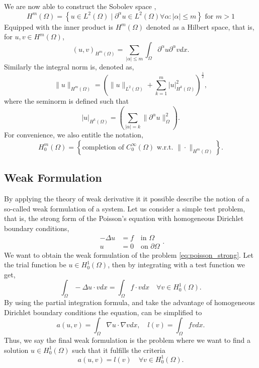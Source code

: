 We are now able to construct the Sobolev space \cite{manzoni2021optimal}, \[
H^{m}\left( \Omega  \right) = \left\{ u \in L^{2}\left( \Omega  \right)  \mid  \partial ^{\alpha } u \in L^{2}\left( \Omega  \right)  \forall \alpha : \left\lvert \alpha  \right\rvert  \le m \right\} \text{ for } m>1
\]
Equipped with the inner product is $H^{m}\left( \Omega  \right) $  denoted as a Hilbert space, that is, for $u,v \in H^{m}\left( \Omega  \right) $, \[
    \left( u,v \right) _{H^{m}\left( \Omega   \right) } = \sum_{\left\lvert \alpha  \right\rvert  \le  m}^{}  \int_{\Omega }^{} \partial ^{\alpha } u \partial ^{\alpha } v dx.
\]
Similarly the integral norm is, denoted as, \[
\| u \|_{ H^{m}\left( \Omega  \right)  }^{  }  = \left( \| u \|_{ L^{2}\left( \Omega  \right)    } + \sum_{k = 1}^{m}  \left\lvert u \right\rvert ^{2} _{  H^{k}\left( \Omega  \right) }\right) ^{\frac{1}{2}},
\]
where the seminorm is defined such that \[
\left\lvert u \right\rvert _{H^{k}\left( \Omega  \right) } = \left( \sum_{\left\lvert \alpha  \right\rvert  = k}^{} \| \partial ^{\alpha }u \|_{ \Omega  }^{ 2 }  \right).
\]
For convenience, we also entitle the notation,
\[
H^{m}_{0} \left( \Omega  \right) = \left\{ \text{completion of }C_{0}^{\infty}\left( \Omega  \right) \text{ w.r.t. } \| \cdot  \|_{H^{m}\left( \Omega  \right)   }^{  }  \right\}.
\]

\subsection{Weak Formulation}%
\label{sub:weak_formulation}

By applying the theory of weak derivative it it possible describe the notion of a so-called weak formulation of a system. Let us consider a simple test problem, that is, the strong form of the Poisson's equation with homogeneous Dirichlet boundary
conditions,
\begin{equation}
\label{eq:poisson_strong}
\begin{split}
-\Delta u & = f \quad \text{in } \Omega \\
u & =0 \quad \text{on } \partial \Omega
\end{split}
.\end{equation}
We want to obtain the weak formulation of the problem \eqref{eq:poisson_strong}. Let the trial function be $u \in H_{0}^{1}\left( \Omega  \right) $, then by integrating with a test function we get, \[
\int_{\Omega }^{} - \Delta u \cdot v dx = \int_{\Omega }^{} f \cdot v dx \quad \forall v \in H^{1}_{0}\left( \Omega  \right).
\]
By using the partial integration formula, and take the advantage of homogeneous Dirichlet boundary conditions the equation, can be simplified to \[
a\left( u,v \right) = \int_{\Omega }^{}  \nabla u\cdot \nabla v dx , \quad l\left( v \right)  = \int_{\Omega }^{}  f v dx.
\]
Thus, we say the final weak formulation is the problem where we want to find a solution $u \in H^{1}_{0}\left( \Omega  \right) $  such that it fulfills the criteria
\begin{equation}
\label{eq:poissons_weak_formulation}
a\left( u,v \right) = l\left( v \right) \quad \forall v \in H^{1}_{0}\left( \Omega  \right).
\end{equation}

